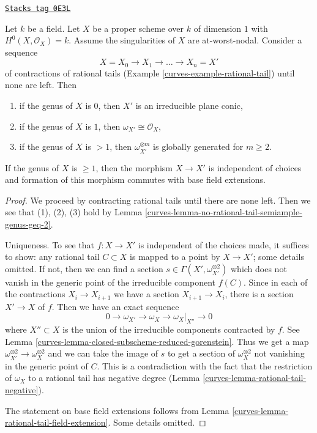 \begin{lemma}
\label{curves-lemma-contracting-rational-tails}
\href{https://stacks.math.columbia.edu/tag/0E3L}{\texttt{Stacks tag 0E3L}}

Let $k$ be a field. Let $X$ be a proper scheme over $k$ of dimension $1$
with $H^0(X, \mathcal{O}_X) = k$. Assume the singularities of $X$ are
at-worst-nodal. Consider a sequence
$$
X = X_0 \to X_1 \to \ldots \to X_n = X'
$$
of contractions of rational tails (Example \ref{curves-example-rational-tail})
until none are left. Then
\begin{enumerate}
\item if the genus of $X$ is $0$, then $X'$ is an irreducible
plane conic,
\item if the genus of $X$ is $1$, then $\omega_{X'} \cong \mathcal{O}_X$,
\item if the genus of $X$ is $> 1$, then
$\omega_{X'}^{\otimes m}$ is globally generated for $m \geq 2$.
\end{enumerate}
If the genus of $X$ is $\geq 1$, then the morphism $X \to X'$
is independent of choices and formation of this morphism
commutes with base field extensions.
\end{lemma}

\begin{proof}

We proceed by contracting rational tails until there are none
left. Then we see that (1), (2), (3) hold by
Lemma \ref{curves-lemma-no-rational-tail-semiample-genus-geq-2}.

\medskip\noindent
Uniqueness. To see that $f : X \to X'$ is independent of the choices
made, it suffices to show: any rational tail $C \subset X$ is
mapped to a point by $X \to X'$; some details omitted.
If not, then we can find a section
$s \in \Gamma(X', \omega_{X'}^{\otimes 2})$ which does
not vanish in the generic point of the irreducible component $f(C)$.
Since in each of the contractions $X_i \to X_{i + 1}$
we have a section $X_{i + 1} \to X_i$, there is a section
$X' \to X$ of $f$. Then we have an exact sequence
$$
0 \to \omega_{X'} \to \omega_X \to \omega_X|_{X''} \to 0
$$
where $X'' \subset X$ is the union of the irreducible components
contracted by $f$. See Lemma \ref{curves-lemma-closed-subscheme-reduced-gorenstein}.
Thus we get a map $\omega_{X'}^{\otimes 2} \to \omega_X^{\otimes 2}$
and we can take the image of $s$ to get a section of
$\omega_X^{\otimes 2}$ not vanishing in the generic point of $C$.
This is a contradiction with the fact that the restriction of
$\omega_X$ to a rational tail has negative degree
(Lemma \ref{curves-lemma-rational-tail-negative}).

\medskip\noindent
The statement on base field extensions follows from
Lemma \ref{curves-lemma-rational-tail-field-extension}. Some details omitted.
\end{proof}

